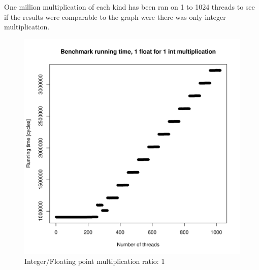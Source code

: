 \documentclass{article}
\def \scalingfactor{.8}
\begin{document}
	One million multiplication of each kind has been ran on 1 to 1024 threads to
    see if the results were comparable to the graph were there was only integer multiplication.
	\begin{figure}[h]
		\centering
		\vspace{-20pt}
    			\includegraphics[width=\scalingfactor\linewidth]{"graphics/running_times_ratio11"}
		\vspace{-15pt}
		\caption{Integer/Floating point multiplication ratio: 1}
	\end{figure}
	\pagebreak
\end{document}
